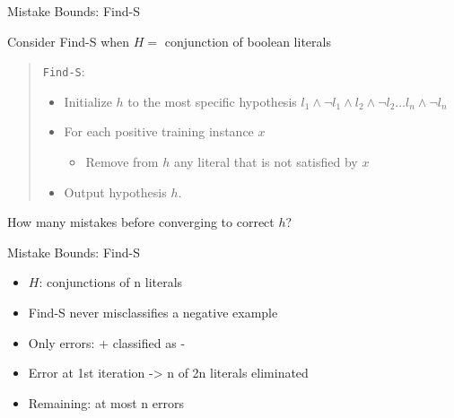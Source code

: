 \documentclass[%
pdf,
colorBG,
slideColor,
tcrico,
]{prosper}
\begin{document}
\begin{slide}{Mistake Bounds: Find-S }

Consider Find-S when $H=$ conjunction of boolean literals
\begin{quote}
\texttt{Find-S}:
\begin{itemize}
\item Initialize $h$ to the most specific hypothesis $l_{1} \wedge \neg l_{1} \wedge l_{2} \wedge \neg l_{2}
\ldots l_{n} \wedge \neg l_{n}$

\item For each positive training instance $x$
\begin{itemize}
\item Remove from $h$ any literal that is not satisfied by $x$
\end{itemize}
\item Output hypothesis $h$.
\end{itemize}
\end{quote}

How many mistakes before converging to correct $h$?
\end{slide}



\begin{slide}{Mistake Bounds: Find-S }


\begin{itemize}
\item $H$: conjunctions of n literals
\item Find-S never misclassifies a negative example
\item Only errors: + classified as -
\item Error at 1st iteration -> n of 2n literals eliminated
\item Remaining: at most n errors
\end{itemize}
\end{slide}



\end{document}
